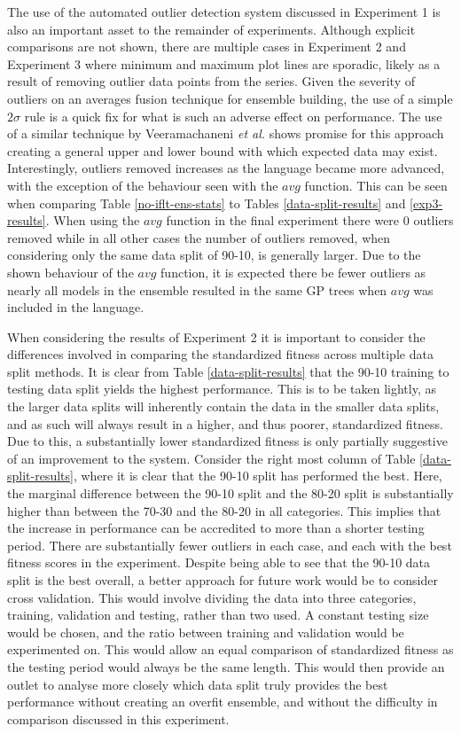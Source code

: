 \documentclass[12pt, letterpaper]{article}
\begin{document}
\textrm{ \indent The use of the automated outlier detection system discussed in Experiment 1 is also an important asset to the remainder of experiments. Although explicit comparisons are not shown, there are multiple cases in Experiment 2 and Experiment 3 where minimum and maximum plot lines are sporadic, likely as a result of removing outlier data points from the series. Given the severity of outliers on an averages fusion technique for ensemble building, the use of a simple $2\sigma$ rule is a quick fix for what is such an adverse effect on performance. The use of a similar technique by Veeramachaneni \textit{et al.} \cite{ensemble1} shows promise for this approach creating a general upper and lower bound with which expected data may exist. Interestingly, outliers removed increases as the language became more advanced, with the exception of the behaviour seen with the $avg$ function. This can be seen when comparing Table \ref{no-iflt-ens-stats} to Tables \ref{data-split-results} and \ref{exp3-results}. When using the $avg$ function in the final experiment there were 0 outliers removed while in all other cases the number of outliers removed, when considering only the same data split of 90-10, is generally larger. Due to the shown behaviour of the $avg$ function, it is expected there be fewer outliers as nearly all models in the ensemble resulted in the same GP trees when $avg$ was included in the language. }

\textrm{ \indent When considering the results of Experiment 2 it is important to consider the differences involved in comparing the standardized fitness across multiple data split methods. It is clear from Table \ref{data-split-results} that the 90-10 training to testing data split yields the highest performance. This is to be taken lightly, as the larger data splits will inherently contain the data in the smaller data splits, and as such will always result in a higher, and thus poorer, standardized fitness. Due to this, a substantially lower standardized fitness is only partially suggestive of an improvement to the system. Consider the right most column of Table \ref{data-split-results}, where it is clear that the 90-10 split has performed the best. Here, the marginal difference between the 90-10 split and the 80-20 split is substantially higher than between the 70-30 and the 80-20 in all categories. This implies that the increase in performance can be accredited to more than a shorter testing period. There are substantially fewer outliers in each case, and each with the best fitness scores in the experiment. Despite being able to see that the 90-10 data split is the best overall, a better approach for future work would be to consider cross validation. This would involve dividing the data into three categories, training, validation and testing, rather than two used. A constant testing size would be chosen, and the ratio between training and validation would be experimented on. This would allow an equal comparison of standardized fitness as the testing period would always be the same length. This would then provide an outlet to analyse more closely which data split truly provides the best performance without creating an overfit ensemble, and without the difficulty in comparison discussed in this experiment. }
\end{document}
